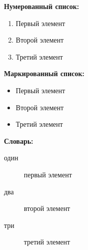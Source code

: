 \documentclass[14pt]{article}
\begin{document}
\textbf{Нумерованный список:}
\begin{enumerate}
    \item Первый элемент
    \item Второй элемент
    \item Третий элемент
\end{enumerate}

\textbf{Маркированный список:}
\begin{itemize}
    \item Первый элемент
    \item Второй элемент
    \item Третий элемент
\end{itemize}

\textbf{Словарь:}
\begin{description}
    \item[один] первый элемент
    \item[два] второй элемент
    \item[три] третий элемент   
\end{description}
\end{document}
